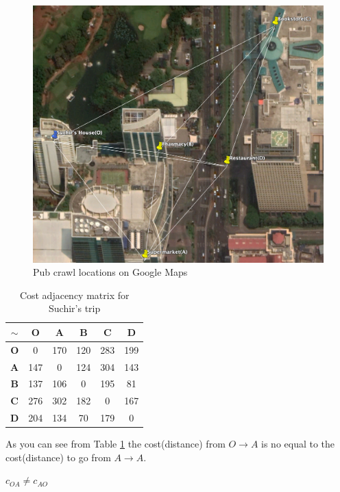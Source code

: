 \documentclass[a4paper]{article}
\begin{document}
\begin{displayquote}
    \begin{figure}[H]
        \centering
        \includegraphics[width=150mm,scale=0.5]{images/suchir.png}
        \caption{Pub crawl locations on Google Maps}
        \label{fig:suchir}
    \end{figure}
    \begin{table}[H]
        \centering
        \begin{tabular}{c|ccccc}
        $\sim$ &\textbf{O}&\textbf{A}&\textbf{B}&\textbf{C}&\textbf{D}\\ \hline
        \textbf{O}& 0   & 170 & 120 & 283 & 199\\
        \textbf{A}& 147 & 0   & 124 & 304 & 143\\
        \textbf{B}& 137 & 106 & 0   & 195 & 81\\
        \textbf{C}& 276 & 302 & 182 & 0   & 167\\
        \textbf{D}& 204 & 134 & 70  & 179 & 0\\
        \end{tabular}
        \caption{Cost adjacency matrix for Suchir's trip}
        \label{tab:suchirCostMatrix}
    \end{table}
\end{displayquote}
As you can see from Table \ref{tab:suchirCostMatrix} the cost(distance) from $O\rightarrow A$ is no equal to the cost(distance) to go from $A \rightarrow A$.
\begin{center}
    $c_{OA} \neq c_{AO}$
\end{center}
\end{document}
